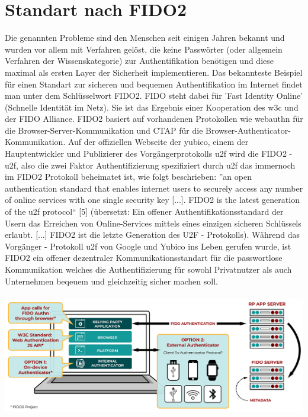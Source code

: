 \section{Standart nach FIDO2}
Die genannten Probleme sind den Menschen seit einigen Jahren bekannt und wurden vor allem mit Verfahren gelöst, die keine Passwörter (oder allgemein Verfahren der Wissenskategorie) zur Authentifikation benötigen und diese maximal als ersten Layer der Sicherheit implementieren. Das bekannteste Beispiel für einen Standart zur sicheren und bequemen Authentifikation im Internet findet man unter dem Schlüsselwort FIDO2. FIDO steht dabei für 'Fast Identity Online' (Schnelle Identität im Netz). Sie ist das Ergebnis einer Kooperation des \ac{w3c} und der FIDO Alliance. FIDO2 basiert auf vorhandenen Protokollen wie \ac{webauthn} für die Browser-Server-Kommunikation und CTAP für die Browser-Authenticator-Kommunikation. Auf der offiziellen Webseite der yubico, einem der Hauptentwickler und Publizierer des Vorgängerprotokolls \ac{u2f} wird die FIDO2 - \ac{u2f}, also die zwei Faktor Authentifizierung spezifiziert durch \ac{u2f} das immernoch im FIDO2 Protokoll beheimatet ist, wie folgt beschrieben: ''an open authentication standard that enables internet users to securely access any number of online services with one single security key [...]. FIDO2 is the latest generation of the \ac{u2f} protocol`` [5] (übersetzt: Ein offener Authentifikationsstandard der Usern das Erreichen von Online-Services mittels eines einzigen sicheren Schlüssels erlaubt. [...] FIDO2 ist die letzte Generation des U2F - Protokolls). Während das Vorgänger - Protokoll \ac{u2f} von Google und Yubico ins Leben gerufen wurde, ist FIDO2 ein offener dezentraler Kommunikationsstandart für die passwortlose Kommunikation welches die Authentifizierung für sowohl Privatnutzer als auch Unternehmen beqeuem und gleichzeitig sicher machen soll. \\ \\
\includegraphics[width=15cm]{Graphics/FIDO2-Graphic-v2.png} \\
